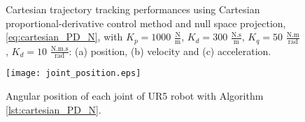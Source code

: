 \begin{figure}[H]
	\centering
	\caption{Cartesian trajectory tracking performances using Cartesian proportional-derivative control method and null space projection, \eqref{eq:cartesian_PD_N}, with  ${K_{p}}=1000$ $\mathrm{\frac{N}{m}}$, $K_{d}= 300$ $\mathrm{\frac{N.s}{m}}$, ${K_{q}}=50$ $\mathrm{\frac{N.m}{rad}}$, $K_{d}= 10$ $\mathrm{\frac{N.m.s}{rad}}$: (a) position, (b) velocity and (c) acceleration.}
	\label{fig:act_1.5_ee_position}
\end{figure}

\begin{figure}
    \centering
    \texttt{[image: joint\_position.eps]}	
    \caption{Angular position of each joint of UR5 robot with Algorithm \ref{lst:cartesian_PD_N}.}
    \label{fig:act_1.5_joint_position}
\end{figure}

